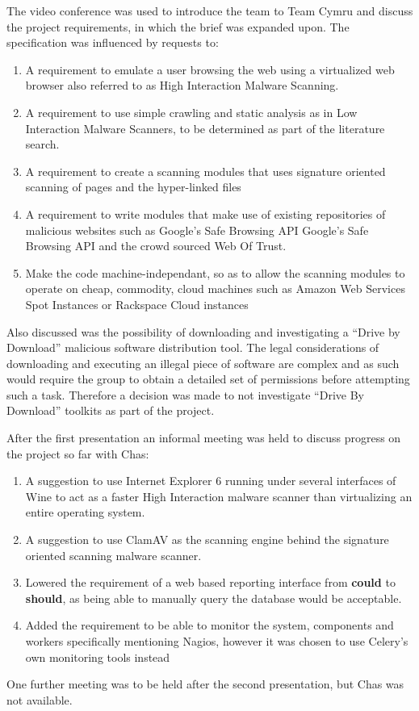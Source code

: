 The video conference was used to introduce the team to Team Cymru and discuss the project requirements, in which the brief was expanded upon. The specification was influenced by requests to:
\begin{enumerate}
    \item A requirement to emulate a user browsing the web using a virtualized web browser also referred to as High Interaction Malware Scanning.

    \item A requirement to use simple crawling and static analysis as in Low Interaction Malware Scanners, to be determined as part of the literature search.

    \item A requirement to create a scanning modules that uses signature oriented scanning of pages and the hyper-linked files

    \item A requirement to write modules that make use of existing repositories of malicious websites such as Google's Safe Browsing API\cite{google-safe} Google's Safe Browsing API and the crowd sourced Web Of Trust.

    \item Make the code machine-independant, so as to allow the scanning modules to operate on cheap, commodity, cloud machines such as Amazon Web Services Spot Instances\cite{aws-spot} or Rackspace Cloud instances\cite{rackspace}
\end{enumerate}

Also discussed was the possibility of downloading and investigating a ``Drive by Download'' malicious software distribution tool.  The legal considerations of downloading and executing an illegal piece of software are complex and as such would require the group to obtain a detailed set of permissions before attempting such a task. Therefore a decision was made to not investigate ``Drive By Download'' toolkits as part of the project.

After the first presentation an informal meeting was held to discuss progress on the project so far with Chas:

\begin{enumerate}
    \item A suggestion to use Internet Explorer 6 running under several interfaces of Wine to act as a faster High Interaction malware scanner than virtualizing an entire operating system.
    \item A suggestion to use ClamAV as the scanning engine behind the signature oriented scanning malware scanner.
    \item Lowered the requirement of a web based reporting interface from \textbf{could} to \textbf{should}, as being able to manually query the database would be acceptable.
    \item Added the requirement to be able to monitor the system, components and workers specifically mentioning Nagios, however it was chosen to use Celery's own monitoring tools instead
\end{enumerate}

One further meeting was to be held after the second presentation, but Chas was not available.


